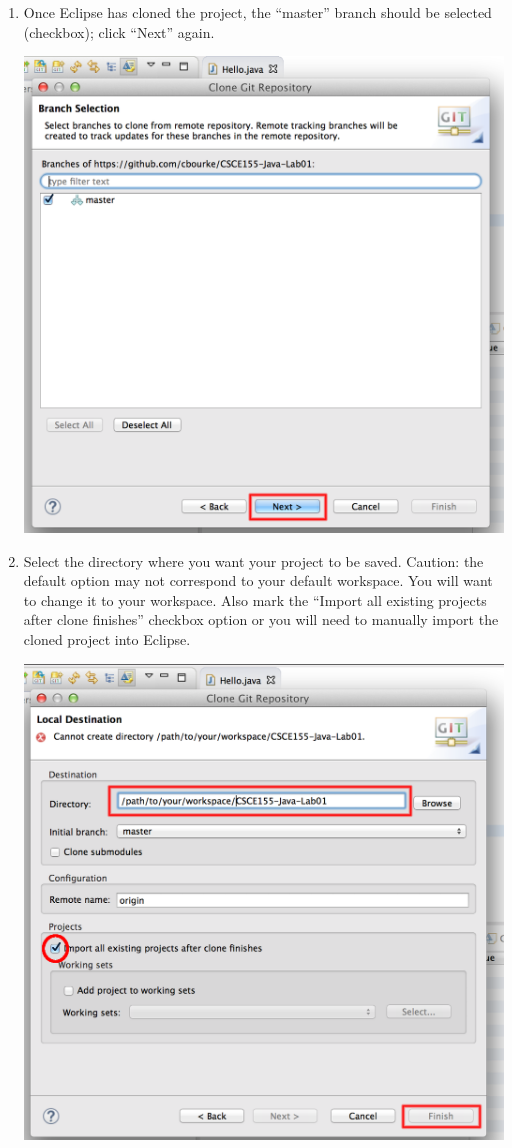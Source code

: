 \documentclass[12pt]{scrartcl}
\begin{document}
\begin{enumerate}
  \item Once Eclipse has cloned the project, the ``master'' branch should
  	be selected (checkbox); click ``Next'' again.
  	\begin{center}
	\includegraphics[scale=0.35]{./hack1.0-files/eclipseCloneDialogBMarkUp}
	\end{center}
  \item Select the directory where you want your project to be saved.  Caution: the default
  	option may not correspond to your default workspace.  You will want to change
	it to your workspace.  Also mark the ``Import all existing 
	projects after clone finishes'' checkbox option or you will need
  	to manually import the cloned project into Eclipse.
  	\begin{center}
	\includegraphics[scale=0.35]{./hack1.0-files/eclipseCloneDialogCMarkUp}

\end{center}
\end{enumerate}
\end{document}
